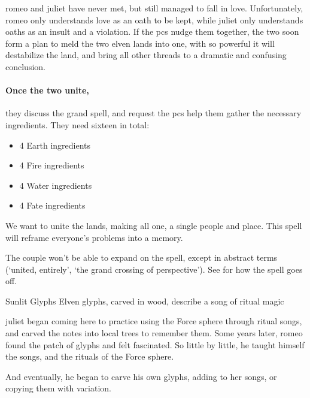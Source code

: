 \label{oathlessLovers}

\Gls{romeo} and \gls{juliet} have never met, but still managed to fall in love.
Unfortunately, \gls{romeo} only understands love as an oath to be kept, while \gls{juliet} only understands oaths as an insult and a violation.
If the \glspl{pc} nudge them together, the two soon form a plan to meld the two elven lands into one, with  so powerful it will destabilize the land, and bring all other threads to a dramatic and confusing conclusion.

\paragraph{Once the two unite,}
they discuss the grand spell, and request the \glspl{pc} help them gather the necessary \glspl{ingredient}.
They need sixteen in total:

\begin{itemize}
  \item
  4 Earth \glspl{ingredient}
  \item
  4 Fire \glspl{ingredient}
  \item
  4 Water \glspl{ingredient}
  \item
  4 Fate \glspl{ingredient}
\end{itemize}

\begin{exampletext}
  We want to unite the lands, making all one, a single people and place.
  This \gls{spell} will reframe everyone's problems into a memory.
\end{exampletext}

The couple won't be able to expand on the spell, except in abstract terms (`united, entirely', `the grand crossing of perspective').
See  for how the spell goes off.

{Sunlit Glyphs}%
{Elven glyphs, carved in wood, describe a song of ritual magic}%

\begin{exampletext}
  \Gls{juliet} began coming here to practice using the Force \gls{sphere} through ritual songs, and carved the notes into local trees to remember them.
  Some years later, \gls{romeo} found the patch of glyphs and felt fascinated.
  So little by little, he taught himself the songs, and the rituals of the Force \gls{sphere}.

  And eventually, he began to carve his own glyphs, adding to her songs, or copying them with variation.
\end{exampletext}

